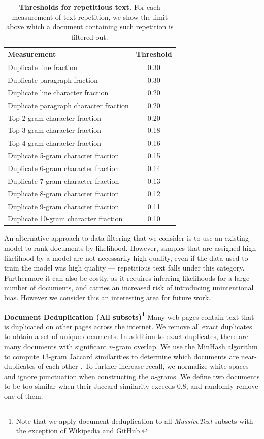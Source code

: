 \documentclass[11pt, a4paper, logo, internal, copyright, nonumbering]{deepmind}
\newcommand{\massivetext}{\textit{MassiveText}\xspace}
\begin{document}
\begin{table}[t]
\centering
\begin{tabular}{l c}
\toprule
Measurement & Threshold \\
\midrule
Duplicate line fraction & 0.30  \\
Duplicate paragraph fraction & 0.30  \\
Duplicate line character fraction & 0.20  \\
Duplicate paragraph character fraction & 0.20  \\
Top 2-gram character fraction & 0.20  \\
Top 3-gram character fraction & 0.18  \\
Top 4-gram character fraction & 0.16  \\
Duplicate 5-gram character fraction & 0.15  \\
Duplicate 6-gram character fraction & 0.14  \\
Duplicate 7-gram character fraction & 0.13  \\
Duplicate 8-gram character fraction & 0.12  \\
Duplicate 9-gram character fraction & 0.11  \\
Duplicate 10-gram character fraction & 0.10  \\
\bottomrule
\end{tabular}
    \caption{\textbf{Thresholds for repetitious text.} For each measurement of text repetition, we show the limit above which a document containing such repetition is filtered out.}
    \label{tab:duplicates}
\end{table}

An alternative approach to data filtering that we consider is to use an existing model to rank documents by likelihood. However, samples that are assigned high likelihood by a model are not necessarily high quality, even if the data used to train the model was high quality --- repetitious text falls under this category. Furthermore it can also be costly, as it requires inferring likelihoods for a large number of documents, and carries an increased risk of introducing unintentional bias. However we consider this an interesting area for future work.

\noindent \textbf{Document Deduplication (All subsets)\footnote{Note that we apply document deduplication to all \massivetext subsets with the exception of Wikipedia and GitHub.}}
Many web pages contain text that is duplicated on other pages across the internet. We remove all exact duplicates to obtain a set of unique documents.  In addition to exact duplicates, there are many documents with significant $n$-gram overlap. We use the MinHash algorithm to compute $13$-gram Jaccard similarities to determine which documents are near-duplicates of each other \citep{lee2021dedup}. To further increase recall, we normalize white spaces and ignore punctuation when constructing the $n$-grams. We define two documents to be too similar when their Jaccard similarity exceeds 0.8, and randomly remove one of them.
\end{document}
